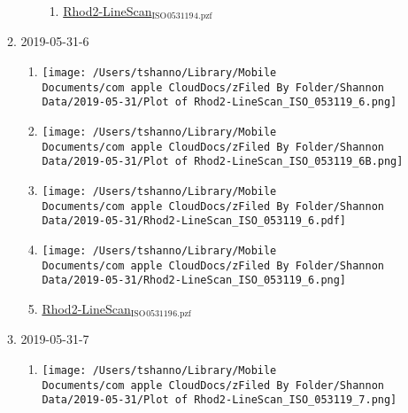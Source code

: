 \documentclass[11pt]{article}
\begin{document}
\begin{enumerate}
\begin{enumerate}
\begin{enumerate}
\begin{enumerate}
\item \href{file:///Users/tshanno/Library/Mobile Documents/com\~apple\~CloudDocs/zFiled By Folder/Shannon Data/2019-05-31/Rhod2-LineScan\_ISO\_053119\_4.pzf}{Rhod2-LineScan\(_{\text{ISO}}\)\(_{\text{053119}}\)\(_{\text{4.pzf}}\)}
\label{sec:org7be2ddf}
\end{enumerate}
\end{enumerate}
\item 2019-05-31-6
\label{sec:orgbf2fc2a}
\begin{enumerate}
\item \begin{center}
\texttt{[image: /Users/tshanno/Library/Mobile Documents/com~apple~CloudDocs/zFiled By Folder/Shannon Data/2019-05-31/Plot of Rhod2-LineScan\_ISO\_053119\_6.png]}
\end{center}
\label{sec:org9a2147a}
\item \begin{center}
\texttt{[image: /Users/tshanno/Library/Mobile Documents/com~apple~CloudDocs/zFiled By Folder/Shannon Data/2019-05-31/Plot of Rhod2-LineScan\_ISO\_053119\_6B.png]}
\end{center}
\label{sec:orgc4298ee}
\item \begin{center}
\texttt{[image: /Users/tshanno/Library/Mobile Documents/com~apple~CloudDocs/zFiled By Folder/Shannon Data/2019-05-31/Rhod2-LineScan\_ISO\_053119\_6.pdf]}
\end{center}
\label{sec:org14ee376}
\item \begin{center}
\texttt{[image: /Users/tshanno/Library/Mobile Documents/com~apple~CloudDocs/zFiled By Folder/Shannon Data/2019-05-31/Rhod2-LineScan\_ISO\_053119\_6.png]}
\end{center}
\label{sec:org8e5c635}
\item \href{file:///Users/tshanno/Library/Mobile Documents/com\~apple\~CloudDocs/zFiled By Folder/Shannon Data/2019-05-31/Rhod2-LineScan\_ISO\_053119\_6.pzf}{Rhod2-LineScan\(_{\text{ISO}}\)\(_{\text{053119}}\)\(_{\text{6.pzf}}\)}
\label{sec:org8516b6c}
\end{enumerate}
\item 2019-05-31-7
\label{sec:org15aebb7}
\begin{enumerate}
\item \begin{center}
\texttt{[image: /Users/tshanno/Library/Mobile Documents/com~apple~CloudDocs/zFiled By Folder/Shannon Data/2019-05-31/Plot of Rhod2-LineScan\_ISO\_053119\_7.png]}

\end{center}
\end{enumerate}
\end{enumerate}
\end{enumerate}
\end{document}
